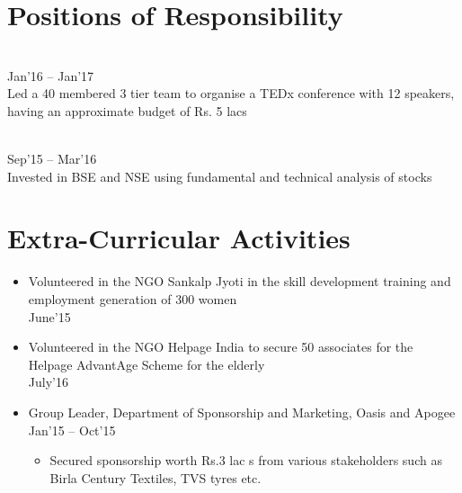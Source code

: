 \documentclass[]{deedy-resume-openfont}
\begin{document}
\begin{minipage}[t]{0.33\textwidth}

\section{Positions of Responsibility}
\\
\hfill Jan'16 -- Jan'17 \\
\textbullet  Led a 40 membered 3 tier team to organise a TEDx conference with 12 speakers, having an approximate budget of Rs. 5 lacs
\sectionsep

\\
\hfill Sep'15 -- Mar'16 \\
\textbullet  Invested in BSE and NSE using fundamental and technical analysis of stocks
\sectionsep


\section{Extra-Curricular Activities}
\begin{itemize}
\item Volunteered in the NGO Sankalp Jyoti in the skill development training and employment generation of 300 women \\ \hfill June'15
\item Volunteered in the NGO Helpage India to secure 50 associates for the Helpage AdvantAge Scheme for the elderly \\ \hfill July'16
\item Group Leader, Department of Sponsorship and Marketing, Oasis and Apogee \\ \hfill Jan'15 -- Oct'15
\begin{itemize}
\item Secured sponsorship worth Rs.3 lac
s from various stakeholders such as Birla Century Textiles, TVS tyres etc.
\end{itemize}
\end{itemize}
\sectionsep

%
%

\end{minipage} 
\end{document}
